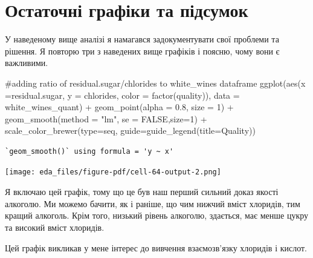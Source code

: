 \documentclass[
  letterpaper,
  DIV=11,
  numbers=noendperiod]{scrreprt}
\newenvironment{Shaded}{\begin{snugshade}}{\end{snugshade}}
\newcommand{\AttributeTok}[1]{\textcolor[rgb]{0.40,0.45,0.13}{#1}}
\newcommand{\CommentTok}[1]{\textcolor[rgb]{0.37,0.37,0.37}{#1}}
\newcommand{\ConstantTok}[1]{\textcolor[rgb]{0.56,0.35,0.01}{#1}}
\newcommand{\DecValTok}[1]{\textcolor[rgb]{0.68,0.00,0.00}{#1}}
\newcommand{\FloatTok}[1]{\textcolor[rgb]{0.68,0.00,0.00}{#1}}
\newcommand{\FunctionTok}[1]{\textcolor[rgb]{0.28,0.35,0.67}{#1}}
\newcommand{\NormalTok}[1]{\textcolor[rgb]{0.00,0.23,0.31}{#1}}
\newcommand{\SpecialCharTok}[1]{\textcolor[rgb]{0.37,0.37,0.37}{#1}}
\newcommand{\StringTok}[1]{\textcolor[rgb]{0.13,0.47,0.30}{#1}}
\begin{document}
\chapter{Остаточні графіки та
підсумок}\label{ux43eux441ux442ux430ux442ux43eux447ux43dux456-ux433ux440ux430ux444ux456ux43aux438-ux442ux430-ux43fux456ux434ux441ux443ux43cux43eux43a}

У наведеному вище аналізі я намагався задокументувати свої проблеми та
рішення. Я повторю три з наведених вище графіків і поясню, чому вони є
важливими.

\begin{Shaded}
\begin{Highlighting}[]
\CommentTok{\#adding ratio of residual.sugar/chlorides to white\_wines dataframe}
\FunctionTok{ggplot}\NormalTok{(}\FunctionTok{aes}\NormalTok{(}\AttributeTok{x =}\NormalTok{residual.sugar, }\AttributeTok{y =}\NormalTok{ chlorides, }\AttributeTok{color =} \FunctionTok{factor}\NormalTok{(quality)), }
       \AttributeTok{data =}\NormalTok{ white\_wines\_quant) }\SpecialCharTok{+}
      \FunctionTok{geom\_point}\NormalTok{(}\AttributeTok{alpha =} \FloatTok{0.8}\NormalTok{, }\AttributeTok{size =} \DecValTok{1}\NormalTok{) }\SpecialCharTok{+}
      \FunctionTok{geom\_smooth}\NormalTok{(}\AttributeTok{method =} \StringTok{"lm"}\NormalTok{, }\AttributeTok{se =} \ConstantTok{FALSE}\NormalTok{,}\AttributeTok{size=}\DecValTok{1}\NormalTok{)  }\SpecialCharTok{+}
  \FunctionTok{scale\_color\_brewer}\NormalTok{(}\AttributeTok{type=}\StringTok{\textquotesingle{}seq\textquotesingle{}}\NormalTok{, }\AttributeTok{guide=}\FunctionTok{guide\_legend}\NormalTok{(}\AttributeTok{title=}\StringTok{\textquotesingle{}Quality\textquotesingle{}}\NormalTok{))}
\end{Highlighting}
\end{Shaded}

\begin{verbatim}
`geom_smooth()` using formula = 'y ~ x'
\end{verbatim}

\texttt{[image: eda\_files/figure-pdf/cell-64-output-2.png]}

Я включаю цей графік, тому що це був наш перший сильний доказ якості
алкоголю. Ми можемо бачити, як і раніше, що чим нижчий вміст хлоридів,
тим кращий алкоголь. Крім того, низький рівень алкоголю, здається, має
менше цукру та високий вміст хлоридів.

Цей графік викликав у мене інтерес до вивчення взаємозв'язку хлоридів і
кислот.
\end{document}
